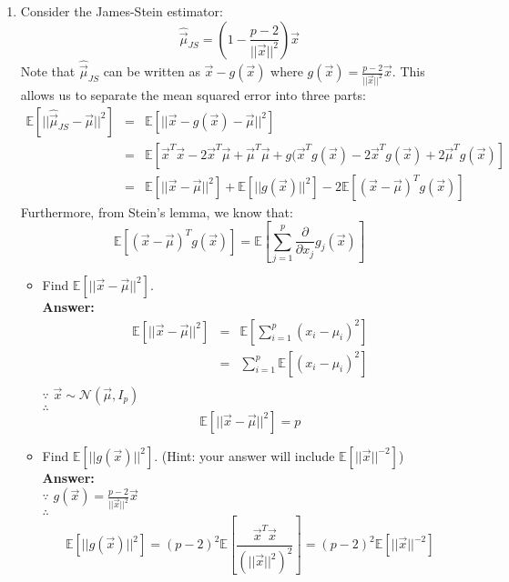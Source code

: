 \documentclass{article}
\begin{document}
\begin{enumerate}
	\item Consider the James-Stein estimator:
	$$\hat{\vec{\mu}}_{JS}=\left(1-\frac{p-2}{||\vec{x}||^2}\right)\vec{x}$$
	Note that $\hat{\vec{\mu}}_{JS}$ can be written as $\vec{x}-g(\vec{x})$ where $g(\vec{x})=\frac{p-2}{||\vec{x}||^2}\vec{x}$. This allows us to separate the mean squared error into three parts:
	\begin{equation}
	\nonumber
	\begin{array}{rcl}
	\mathbb{E}[||\hat{\vec{\mu}}_{JS}-\vec{\mu}||^2] & = & \mathbb{E}[||\vec{x}-g(\vec{x})-\vec{\mu}||^2] \\
												& = & \mathbb{E}[\vec{x}^T\vec{x}-2\vec{x}^T\vec{\mu}+\vec{\mu}^T\vec{\mu}+g(\vec{x}^Tg(\vec{x})-2\vec{x}^Tg(\vec{x})+2\vec{\mu}^Tg(\vec{x})] \\
												& = & \mathbb{E}[||\vec{x}-\vec{\mu}||^2]+\mathbb{E}[||g(\vec{x})||^2]-2\mathbb{E}[(\vec{x}-\vec{\mu})^Tg(\vec{x})]
	\end{array}
	\end{equation}
	Furthermore, from Stein's lemma, we know that: 
	$$\mathbb{E}[(\vec{x}-\vec{\mu})^Tg(\vec{x})] = \mathbb{E}\left[\sum_{j=1}^{p}{\frac{\partial}{\partial x_j}g_j(\vec{x})}\right]$$
	\begin{itemize}
		\item Find $\mathbb{E}[||\vec{x}-\vec{\mu}||^2]$.
		\\\textbf{Answer:}\\
		\begin{equation}
		\nonumber
		\begin{array}{rcl}
		\mathbb{E}[||\vec{x}-\vec{\mu}||^2] & = & \mathbb{E}[\sum_{i=1}^{p}{(x_i-\mu_i)^2}] \\
											& = & \sum_{i=1}^{p}{\mathbb{E}[(x_i-\mu_i)^2]} \\
		\end{array}
		\end{equation}
		$\because$ $\vec{x}\sim\mathcal{N}(\vec{\mu},I_p)$\\
		$\therefore$
		$$\mathbb{E}[||\vec{x}-\vec{\mu}||^2] = p$$
		
		\item Find $\mathbb{E}[||g(\vec{x})||^2]$. (Hint: your answer will include $\mathbb{E}[||\vec{x}||^{-2}]$)
		\\\textbf{Answer:}\\
		$\because$ $g(\vec{x})=\frac{p-2}{||\vec{x}||^2}\vec{x}$\\
		$\therefore$
		$$\mathbb{E}[||g(\vec{x})||^2] = (p-2)^2\mathbb{E}[\frac{\vec{x}^T\vec{x}}{(||\vec{x}||^2)^2}]=(p-2)^2\mathbb{E}[||\vec{x}||^{-2}]$$
		

\end{itemize}
\end{enumerate}
\end{document}
